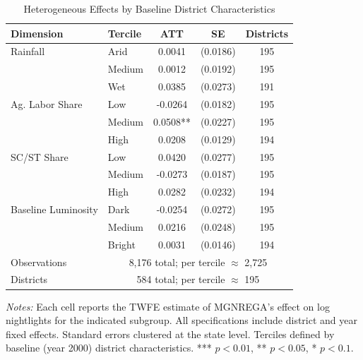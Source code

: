 \begin{table}[htbp]
\centering
\caption{Heterogeneous Effects by Baseline District Characteristics}
\label{tab:heterogeneity}
\begin{tabular}{llccc}
\hline\hline
Dimension & Tercile & ATT & SE & Districts \\
\hline
Rainfall & Arid & 0.0041 & (0.0186) & 195 \\
 & Medium & 0.0012 & (0.0192) & 195 \\
 & Wet & 0.0385 & (0.0273) & 191 \\
\addlinespace
Ag. Labor Share & Low & -0.0264 & (0.0182) & 195 \\
 & Medium & 0.0508** & (0.0227) & 195 \\
 & High & 0.0208 & (0.0129) & 194 \\
\addlinespace
SC/ST Share & Low & 0.0420 & (0.0277) & 195 \\
 & Medium & -0.0273 & (0.0187) & 195 \\
 & High & 0.0282 & (0.0232) & 194 \\
\addlinespace
Baseline Luminosity & Dark & -0.0254 & (0.0272) & 195 \\
 & Medium & 0.0216 & (0.0248) & 195 \\
 & Bright & 0.0031 & (0.0146) & 194 \\
\addlinespace
Observations & \multicolumn{4}{c}{8,176 total; per tercile $\approx$ 2,725} \\
Districts & \multicolumn{4}{c}{584 total; per tercile $\approx$ 195} \\
\hline\hline
\end{tabular}
\begin{tablenotes}[flushleft]\small
\item \textit{Notes:} Each cell reports the TWFE estimate of MGNREGA's effect on log nightlights for the indicated subgroup. All specifications include district and year fixed effects. Standard errors clustered at the state level. Terciles defined by baseline (year 2000) district characteristics. *** $p<0.01$, ** $p<0.05$, * $p<0.1$.
\end{tablenotes}
\end{table}
